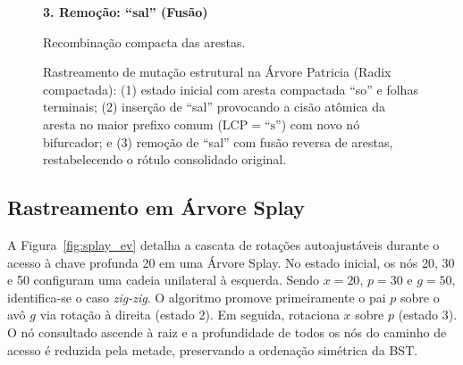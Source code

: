 \documentclass[11pt,a4paper]{article}
\begin{document}
\begin{figure}[htbp]
\begin{minipage}[t]{0.31\textwidth}
\centering\textbf{3. Remoção: ``sal'' (Fusão)}\par\smallskip
{}
\par\tiny Recombinação compacta das arestas.
\end{minipage}
\caption{Rastreamento de mutação estrutural na Árvore Patricia (Radix compactada): (1) estado inicial com aresta compactada ``so'' e folhas terminais; (2) inserção de ``sal'' provocando a cisão atômica da aresta no maior prefixo comum ($\mathrm{LCP}=\text{``s''}$) com novo nó bifurcador; e (3) remoção de ``sal'' com fusão reversa de arestas, restabelecendo o rótulo consolidado original.}
\label{fig:patricia_ev}
\end{figure}

\subsection{Rastreamento em Árvore Splay}
A Figura~\ref{fig:splay_ev} detalha a cascata de rotações autoajustáveis durante o acesso à chave profunda 20 em uma Árvore Splay. No estado inicial, os nós 20, 30 e 50 configuram uma cadeia unilateral à esquerda. Sendo $x=20$, $p=30$ e $g=50$, identifica-se o caso \textit{zig-zig}. O algoritmo promove primeiramente o pai $p$ sobre o avô $g$ via rotação à direita (estado 2). Em seguida, rotaciona $x$ sobre $p$ (estado 3). O nó consultado ascende à raiz e a profundidade de todos os nós do caminho de acesso é reduzida pela metade, preservando a ordenação simétrica da BST.
\end{document}
